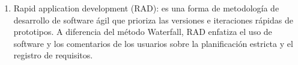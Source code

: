 \begin{enumerate}
        \item Rapid application development (RAD):  es una forma de metodología de desarrollo de software ágil que prioriza las versiones e iteraciones rápidas de prototipos. A diferencia del método Waterfall, RAD enfatiza el uso de software y los comentarios de los usuarios sobre la planificación estricta y el registro de requisitos.
    \end{enumerate}
